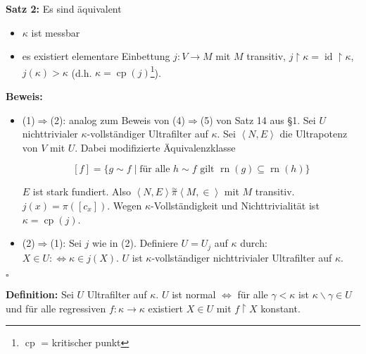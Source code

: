 \documentclass[a4paper,fontsize=11pt]{scrartcl}
\newcommand{\id}{\operatorname{id}}
\newcommand{\rn}{\operatorname{rn}}
\newcommand{\cp}{\operatorname{cp}}
\begin{document}
{\bf Satz 2:} Es sind äquivalent
\begin{itemize}
  \item[(1)] $\kappa$ ist messbar
  \item[(2)] es existiert elementare Einbettung $j:V\rightarrow M$ mit
    $M$ transitiv, $j\upharpoonright\kappa =
    \id\upharpoonright\kappa$, $j(\kappa)>\kappa$ (d.h. $\kappa =
    \cp(j)$\footnote{$\cp$ = kritischer punkt}).
\end{itemize}
{\bf Beweis:}
\begin{itemize}
  \item (1)$\Rightarrow$(2): analog zum Beweis von (4)$\Rightarrow$(5)
    von Satz 14 aus §1. Sei $U$ nichttrivialer $\kappa$-vollständiger
    Ultrafilter auf $\kappa$. Sei $\left<N,E\right>$ die Ultrapotenz
    von $V$ mit $U$. Dabei modifizierte Äquivalenzklasse

    $$ [f] = \{g\sim f\mid\mbox{für alle }h\sim f\mbox{ gilt
  }\rn(g)\subseteq\rn(h)\} $$

    $E$ ist stark fundiert. Also
    $\left<N,E\right>\stackrel{\simeq}{\pi}\left<M,\in\right>$ mit $M$
    transitiv. $j(x)=\pi([c_x])$. Wegen $\kappa$-Vollständigkeit und
    Nichttrivialität ist $\kappa=\cp(j)$.
  \item (2)$\Rightarrow$(1): Sei $j$ wie in (2). Definiere $U=U_j$ auf
    $\kappa$ durch: $X\in U :\Leftrightarrow \kappa\in j(X)$. $U$ ist
    $\kappa$-vollständiger nichttrivialer Ultrafilter auf $\kappa$.
\end{itemize}
\hfill $\square$

{\bf Definition:} Sei $U$ Ultrafilter auf $\kappa$. $U$ ist normal
$\Leftrightarrow$ für alle $\gamma<\kappa$ ist
$\kappa\backslash\gamma\in U$ und für alle regressiven
$f:\kappa\rightarrow\kappa$ existiert $X\in U$ mit $f\upharpoonright
X$ konstant.
\end{document}
